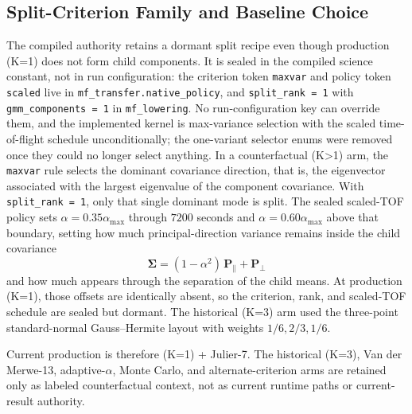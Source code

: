     \subsection{Split-Criterion Family and Baseline Choice}
    The compiled authority retains a dormant split recipe even though production (K=1) does not form child components. It is sealed in the compiled science constant, not in run configuration: the criterion token \texttt{maxvar} and policy token \texttt{scaled} live in \texttt{mf\_transfer.native\_policy}, and \texttt{split\_rank = 1} with \texttt{gmm\_components = 1} in \texttt{mf\_lowering}. No run-configuration key can override them, and the implemented kernel is max-variance selection with the scaled time-of-flight schedule unconditionally; the one-variant selector enums were removed once they could no longer select anything.
    In a counterfactual (K>1) arm, the \texttt{maxvar} rule selects the dominant covariance direction, that is, the eigenvector associated with the largest eigenvalue of the component covariance. With \texttt{split\_rank = 1}, only that single dominant mode is split. The sealed scaled-TOF policy sets \(\alpha=0.35\alpha_{\max}\) through \(7200\) seconds and \(\alpha=0.60\alpha_{\max}\) above that boundary, setting how much principal-direction variance remains inside the child covariance
    \[
        \boldsymbol{\Sigma}=(1-\alpha^2)\,\boldsymbol{P}_{\parallel}+\boldsymbol{P}_{\perp}
    \]
    and how much appears through the separation of the child means. At production (K=1), those offsets are identically absent, so the criterion, rank, and scaled-TOF schedule are sealed but dormant. The historical (K=3) arm used the three-point standard-normal Gauss--Hermite layout with weights \(1/6,2/3,1/6\).

    Current production is therefore (K=1) + Julier-7. The historical (K=3), Van der Merwe-13, adaptive-\(\alpha\), Monte Carlo, and alternate-criterion arms are retained only as labeled counterfactual context, not as current runtime paths or current-result authority.

